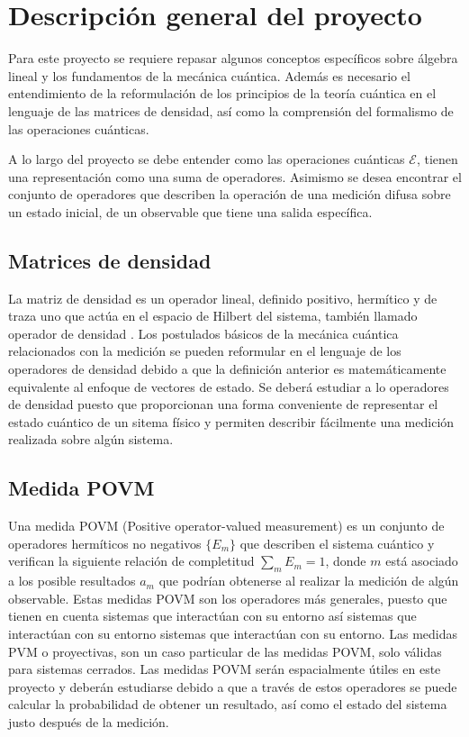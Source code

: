 \section{Descripción general del proyecto}



Para este proyecto se requiere repasar algunos conceptos específicos sobre álgebra lineal y los fundamentos de la mecánica cuántica. Además es necesario el entendimiento de la reformulación de los principios de la teoría cuántica en el lenguaje de las matrices de densidad, así como la comprensión del formalismo de las operaciones cuánticas.


 A lo largo del proyecto se debe entender como las operaciones cuánticas $\mathcal{E}$, tienen una representación como una suma de operadores. Asimismo se desea encontrar el conjunto de operadores que describen la operación de una medición difusa sobre un estado inicial, de un observable que tiene una salida específica.
 



\subsection{Matrices de densidad}

La matriz de densidad es un operador lineal, definido positivo, hermítico y de traza uno que actúa en el espacio de Hilbert del sistema, también llamado operador de densidad \cite{nielsen_chuang_2010}. Los postulados básicos de la mecánica cuántica relacionados con la medición se pueden reformular en el lenguaje de los operadores de densidad debido a que la definición anterior es matemáticamente equivalente al enfoque de vectores de estado. Se deberá estudiar a lo operadores de densidad puesto que proporcionan una forma conveniente de representar el estado cuántico de un sitema físico y permiten describir fácilmente una medición realizada sobre algún sistema.


\subsection{Medida POVM }


Una medida POVM (Positive operator-valued measurement) es un conjunto de operadores hermíticos no negativos $\{E_{m}\}$  que describen el sistema cuántico y verifican la siguiente relación de completitud $\sum _{m}E_{m}=1$, donde $m$ está asociado a los posible resultados $a_m$ que podrían obtenerse al realizar la medición de algún observable. Estas medidas POVM son los operadores más generales, puesto que tienen en cuenta  sistemas que interactúan con su entorno así sistemas que interactúan con su entorno sistemas que interactúan con su entorno. Las medidas PVM o proyectivas, son un caso particular de las medidas POVM, solo válidas para sistemas cerrados. Las medidas POVM serán espacialmente útiles en este proyecto y deberán estudiarse debido a que a través de estos operadores se puede calcular la probabilidad de obtener un resultado, así como el estado del sistema justo después de la medición.
 


